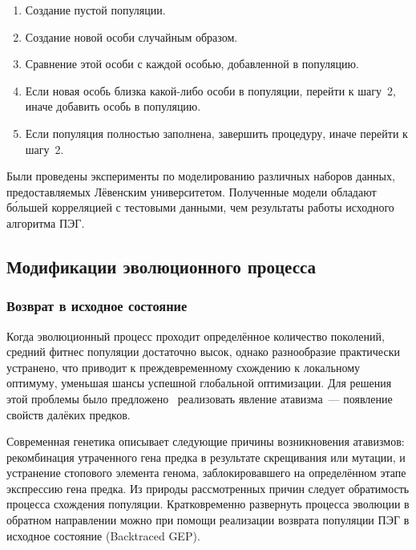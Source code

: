 \begin{enumerate} \itemsep0pt \parskip0pt 
  \item Создание пустой популяции.
  \item Создание новой особи случайным образом.
  \item Сравнение этой особи с каждой особью, добавленной в популяцию.
  \item Если новая особь близка какой-либо особи в популяции, перейти к шагу~2, иначе добавить особь в популяцию.
  \item Если популяция полностью заполнена, завершить процедуру, иначе перейти к шагу~2.
\end{enumerate}

Были проведены эксперименты по моделированию различных наборов данных, предоставляемых Лёвенским университетом. Полученные модели обладают б\'{о}льшей корреляцией с тестовыми данными, чем результаты работы исходного алгоритма ПЭГ.






\subsection{Модификации эволюционного процесса}

\subsubsection{Возврат в исходное состояние}

Когда эволюционный процесс проходит определённое количество поколений, средний фитнес популяции достаточно высок, однако разнообразие практически устранено, что приводит к преждевременному схождению к локальному оптимуму, уменьшая шансы успешной глобальной оптимизации. Для решения этой проблемы было предложено~\cite{zhong2006improve} реализовать явление атавизма~--- появление свойств далёких предков. 

Современная генетика описывает следующие причины возникновения атавизмов: рекомбинация утраченного гена предка в результате скрещивания или мутации, и устранение стопового элемента генома, заблокировавшего на определённом этапе экспрессию гена предка. Из природы рассмотренных причин следует обратимость процесса схождения популяции. Кратковременно развернуть процесса эволюции в обратном направлении можно при помощи реализации возврата популяции ПЭГ в исходное состояние (Backtraced GEP).

